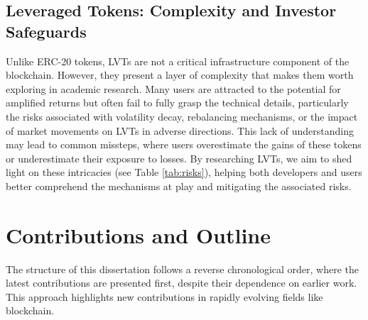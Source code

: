 \subsection*{Leveraged Tokens: Complexity and Investor Safeguards}
Unlike ERC-20 tokens, LVTs are not a critical infrastructure component of the blockchain. However, they present a layer of complexity that makes them worth exploring in academic research. Many users are attracted to the potential for amplified returns but often fail to fully grasp the technical details, particularly the risks associated with volatility decay, rebalancing mechanisms, or the impact of market movements on LVTs in adverse directions. This lack of understanding may lead to common missteps, where users overestimate the gains of these tokens or underestimate their exposure to losses. By researching LVTs, we aim to shed light on these intricacies (see Table \ref{tab:risks}), helping both developers and users better comprehend the mechanisms at play and mitigating the associated risks.


\section{Contributions and Outline} 
The structure of this dissertation follows a reverse chronological order, where the latest contributions are presented first, despite their dependence on earlier work. This approach highlights new contributions in rapidly evolving fields like blockchain.

	
	
